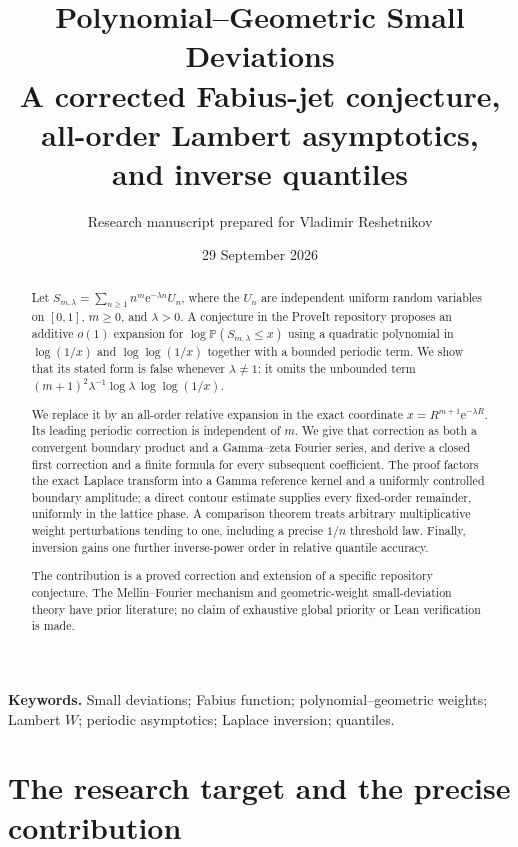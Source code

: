 \documentclass[11pt,a4paper]{article}
\title{\textbf{Polynomial--Geometric Small Deviations}\\[0.5em]
\large A corrected Fabius-jet conjecture, all-order Lambert asymptotics,\\
and inverse quantiles}
\author{Research manuscript prepared for Vladimir Reshetnikov}
\date{29 September 2026}
\numberwithin{equation}{section}
\theoremstyle{definition}
\newcommand{\Prob}{\mathbb P}
\newcommand{\ee}{\mathrm e}
\begin{document}
\maketitle
\begin{abstract}
Let $S_{m,\lambda}=\sum_{n\geq1}n^m\ee^{-\lambda n}U_n$, where the $U_n$ are independent uniform random variables on $[0,1]$, $m\geq0$, and $\lambda>0$. A conjecture in the ProveIt repository proposes an additive $o(1)$ expansion for $\log\Prob(S_{m,\lambda}\leq x)$ using a quadratic polynomial in $\log(1/x)$ and $\log\log(1/x)$ together with a bounded periodic term. We show that its stated form is false whenever $\lambda\ne1$: it omits the unbounded term $(m+1)^2\lambda^{-1}\log\lambda\,\log\log(1/x)$.

We replace it by an all-order relative expansion in the exact coordinate $x=R^{m+1}\ee^{-\lambda R}$. Its leading periodic correction is independent of $m$. We give that correction as both a convergent boundary product and a Gamma--zeta Fourier series, and derive a closed first correction and a finite formula for every subsequent coefficient. The proof factors the exact Laplace transform into a Gamma reference kernel and a uniformly controlled boundary amplitude; a direct contour estimate supplies every fixed-order remainder, uniformly in the lattice phase. A comparison theorem treats arbitrary multiplicative weight perturbations tending to one, including a precise $1/n$ threshold law. Finally, inversion gains one further inverse-power order in relative quantile accuracy.

The contribution is a proved correction and extension of a specific repository conjecture. The Mellin--Fourier mechanism and geometric-weight small-deviation theory have prior literature; no claim of exhaustive global priority or Lean verification is made.
\end{abstract}
\noindent\textbf{Keywords.} Small deviations; Fabius function; polynomial--geometric weights; Lambert $W$; periodic asymptotics; Laplace inversion; quantiles.

\clearpage
\tableofcontents
\clearpage

\section{The research target and the precise contribution}
\label{sec:target}
\end{document}
